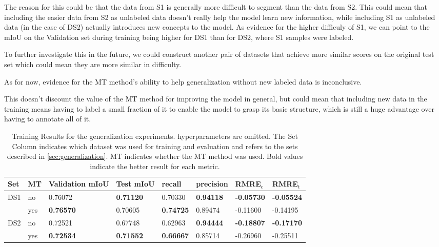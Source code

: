 The reason for this could be that the data from S1 is generally more difficult to segment than the data from S2. 
This could mean that including the easier data from S2 as unlabeled data doesn't really help the model learn new information, while including S1 as unlabeled data (in the case of DS2) actually introduces new concepts to the model.
As evidence for the higher difficuly of S1, we can point to the mIoU on the Validation set during training being higher for DS1 than for DS2, where S1 samples were labeled.

To further investigate this in the future, we could construct another pair of datasets that achieve more similar scores on the original test set which could mean they are more similar in difficulty. 

As for now, evidence for the MT method's ability to help generalization without new labeled data is inconclusive. 

This doesn't discount the value of the MT method for improving the model in general, but could mean that including new data in the training means having to label a small fraction of it to enable the model to grasp its basic structure, which is still a huge advantage over having to annotate all of it.

\begin{table}[htbp]
    \centering
    \begin{tabular}{llllllll} 
        \toprule
        Set & MT  & Validation mIoU    & Test mIoU        & recall           & precision        & RMRE$_\text{c}$   & RMRE$_\text{t}$   \\ \midrule
        DS1 & no  & 0.76072          & \textbf{0.71120} & 0.70330          & \textbf{0.94118} & \textbf{-0.05730} & \textbf{-0.05524} \\
            & yes & \textbf{0.76570} & 0.70605          & \textbf{0.74725} & 0.89474          & -0.11600          & -0.14195          \\
        DS2 & no  & 0.72521          & 0.67748          & 0.62963          & \textbf{0.94444} & \textbf{-0.18807} & \textbf{-0.17170} \\
            & yes & \textbf{0.72534} & \textbf{0.71552} & \textbf{0.66667} & 0.85714          & -0.26960          & -0.25511          \\ \bottomrule
    \end{tabular}
    \vspace*{0.2cm}
    \caption{Training Results for the generalization experiments. hyperparameters are omitted. The Set Column indicates which dataset was used for training and evaluation and refers to the sets described in \ref{sec:generalization}. MT indicates whether the MT method was used. Bold values indicate the better result for each metric.}
    \label{tab:generalization}
\end{table}
